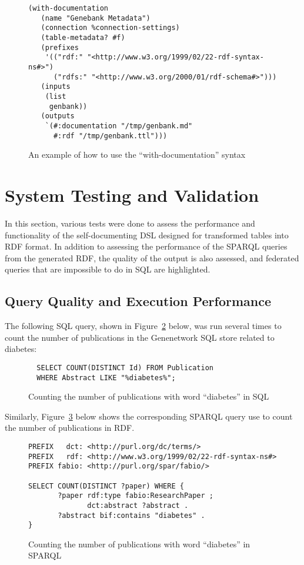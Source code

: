 \begin{figure}[H]
\centering
\begin{verbatim}
(with-documentation
   (name "Genebank Metadata")
   (connection %connection-settings)
   (table-metadata? #f)
   (prefixes
    '(("rdf:" "<http://www.w3.org/1999/02/22-rdf-syntax-ns#>")
      ("rdfs:" "<http://www.w3.org/2000/01/rdf-schema#>")))
   (inputs
    (list
     genbank))
   (outputs
    `(#:documentation "/tmp/genbank.md"
      #:rdf "/tmp/genbank.ttl")))
\end{verbatim}
\caption{An example of how to use the ``with-documentation'' syntax}\label{code:with-documentation-example}
\end{figure}

\section{System Testing and Validation}

In this section, various tests were done to assess the performance and functionality of the self-documenting DSL designed for transformed tables into RDF format.  In addition to assessing the performance of the SPARQL queries from the generated RDF, the quality of the output is also assessed, and federated queries that are impossible to do in SQL are highlighted.

\subsection{Query Quality and Execution Performance}

The following SQL query, shown in Figure~\ref{sql:counting-pubs-with-diabetes} below, was run several times to count the number of publications in the Genenetwork SQL store related to diabetes:

\begin{figure}[H]
\centering
\begin{verbatim}
  SELECT COUNT(DISTINCT Id) FROM Publication
  WHERE Abstract LIKE "%diabetes%";
\end{verbatim}
\caption{Counting the number of publications with word ``diabetes'' in SQL}\label{sql:counting-pubs-with-diabetes}
\end{figure}

Similarly, Figure~\ref{sparql:counting-pubs-with-diabetes} below shows the corresponding SPARQL query use to count the number of publications in RDF\@.

\begin{figure}[H]
\centering
\begin{verbatim}
PREFIX   dct: <http://purl.org/dc/terms/>
PREFIX   rdf: <http://www.w3.org/1999/02/22-rdf-syntax-ns#>
PREFIX fabio: <http://purl.org/spar/fabio/>

SELECT COUNT(DISTINCT ?paper) WHERE {
       ?paper rdf:type fabio:ResearchPaper ;
              dct:abstract ?abstract .
       ?abstract bif:contains "diabetes" .
}
\end{verbatim}
\caption{Counting the number of publications with word ``diabetes'' in SPARQL}\label{sparql:counting-pubs-with-diabetes}
\end{figure}


